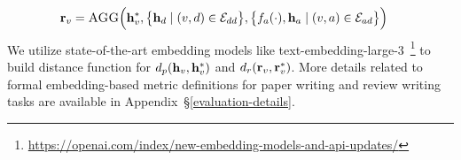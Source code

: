 \vspace{-6mm}
\begingroup
\small
\begin{equation}
\begin{split}
\mathbf{r}_{v} &= \textsc{AGG}\Big(
    \mathbf{h}_v^*, \big\{\mathbf{h}_d \mid (v,d) \in \mathcal{E}_{dd}\big\}
    , \big\{f_a(\cdot), \mathbf{h}_a \mid (v,a) \in \mathcal{E}_{ad}\big\}
\Big)
\end{split}
\end{equation}
\endgroup
{} We utilize state-of-the-art embedding models like text-embedding-large-3~\footnote{\url{https://openai.com/index/new-embedding-models-and-api-updates/}} to build distance function for $d_p(\mathbf{h}_v, \mathbf{h}_v^*)$ and $d_r(\mathbf{r}_v, \mathbf{r}_v^*)$. More details related to formal embedding-based metric definitions for paper writing and review writing tasks are available in Appendix~\S\ref{evaluation-details}.